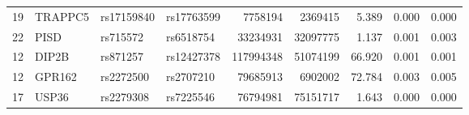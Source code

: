 \documentclass{article}
\begin{document}
\begin{table}[ht]
{\begin{threeparttable}
\begin{tabular}{llllrrrrr}
19 & TRAPPC5 & rs17159840 & rs17763599 & 7758194 & 2369415 & 5.389 & 0.000 & 0.000 \\
22 & PISD & rs715572 & rs6518754 & 33234931 & 32097775 & 1.137 & 0.001 & 0.003 \\
12 & DIP2B & rs871257 & rs12427378 & 117994348 & 51074199 & 66.920 & 0.001 & 0.001 \\
12 & GPR162 & rs2272500 & rs2707210 & 79685913 & 6902002 & 72.784 & 0.003 & 0.005 \\
17 & USP36 & rs2279308 & rs7225546 & 76794981 & 75151717 & 1.643 & 0.000 & 0.000 \\
\hline
\end{tabular}
\end{threeparttable}
}
\end{table}
\end{document}
